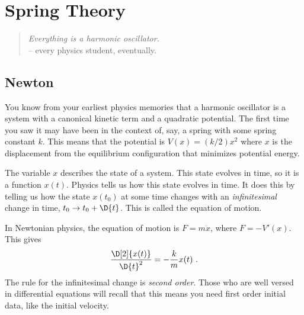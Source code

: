 \chapter{Spring Theory}
\label{ch:spring:theory}

\begin{quote}
\emph{Everything is a harmonic oscillator.}
\\ -- every physics student, eventually.
\end{quote}


\section{Newton}

You know from your earliest physics memories that a harmonic oscillator is a system with a canonical kinetic term and a quadratic potential. The first time you saw it may have been in the context of, say, a spring with some spring constant $k$. This means that the potential is $V(x)=(k/2)x^2$ where $x$ is the displacement from the equilibrium configuration that minimizes potential energy. 

The variable $x$ describes the state of a system. This state evolves in time, so it is a function $x(t)$. Physics tells us how this state evolves in time. It does this by telling us how the state $x(t_0)$ at some time changes with an \emph{infinitesimal} change in time, $t_0 \to t_0 + \D{t}$. This is called the equation of motion. 

In Newtonian physics, the equation of motion is $F=m\ddot{x}$, where $F = -V'(x)$. This gives
\begin{align}
    \frac{ \D[2]{x(t)} }{ \D{t}^2 } 
    = 
    - \frac{ k }{ m } x(t) \ .
\end{align}
The rule for the infinitesimal change is \emph{second order}. Those who are well versed in differential equations will recall that this means you need first order initial data, like the initial velocity.



